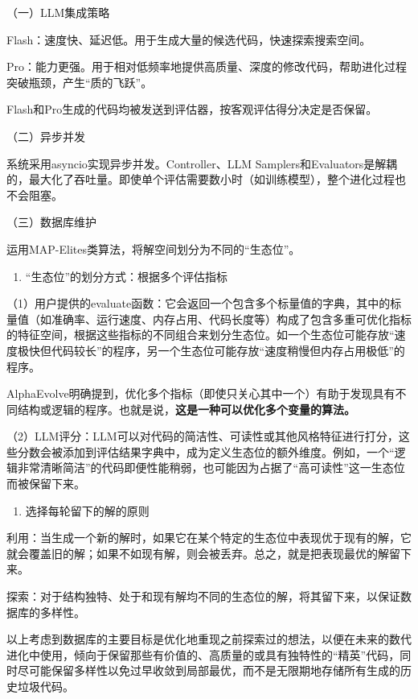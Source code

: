 （一）LLM集成策略

Flash：速度快、延迟低。用于生成大量的候选代码，快速探索搜索空间。

Pro：能力更强。用于相对低频率地提供高质量、深度的修改代码，帮助进化过程突破瓶颈，产生``质的飞跃''。

Flash和Pro生成的代码均被发送到评估器，按客观评估得分决定是否保留。

（二）异步并发

系统采用asyncio实现异步并发。Controller、LLM Samplers和Evaluators是解耦的，最大化了吞吐量。即使单个评估需要数小时（如训练模型），整个进化过程也不会阻塞。

（三）数据库维护

运用MAP-Elites类算法，将解空间划分为不同的``生态位''。

\begin{enumerate}
\def\labelenumi{\arabic{enumi}.}
\tightlist
\item
  ``生态位''的划分方式：根据多个评估指标
\end{enumerate}

（1）用户提供的evaluate函数：它会返回一个包含多个标量值的字典，其中的标量值（如准确率、运行速度、内存占用、代码长度等）构成了包含多重可优化指标的特征空间，根据这些指标的不同组合来划分生态位。如一个生态位可能存放``速度极快但代码较长''的程序，另一个生态位可能存放``速度稍慢但内存占用极低''的程序。

AlphaEvolve明确提到，优化多个指标（即使只关心其中一个）有助于发现具有不同结构或逻辑的程序。也就是说，\textbf{这是一种可以优化多个变量的算法。}

（2）LLM评分：LLM可以对代码的简洁性、可读性或其他风格特征进行打分，这些分数会被添加到评估结果字典中，成为定义生态位的额外维度。例如，一个``逻辑非常清晰简洁''的代码即便性能稍弱，也可能因为占据了``高可读性''这一生态位而被保留下来。

\begin{enumerate}
\def\labelenumi{\arabic{enumi}.}
\setcounter{enumi}{1}
\tightlist
\item
  选择每轮留下的解的原则
\end{enumerate}

利用：当生成一个新的解时，如果它在某个特定的生态位中表现优于现有的解，它就会覆盖旧的解；如果不如现有解，则会被丢弃。总之，就是把表现最优的解留下来。

探索：对于结构独特、处于和现有解均不同的生态位的解，将其留下来，以保证数据库的多样性。

以上考虑到数据库的主要目标是优化地重现之前探索过的想法，以便在未来的数代进化中使用，倾向于保留那些有价值的、高质量的或具有独特性的``精英''代码，同时尽可能保留多样性以免过早收敛到局部最优，而不是无限期地存储所有生成的历史垃圾代码。

